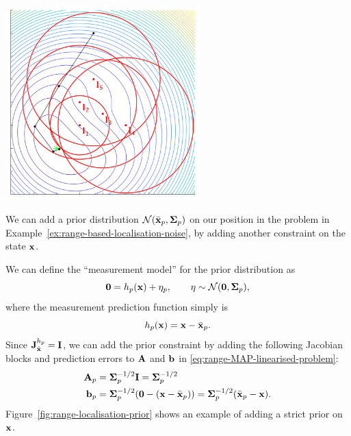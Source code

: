 \begin{example}[frametitle=Range-based localisation with prior]

{
  \centering
  \includegraphics[height=7.5cm]{figures/range-localisation-prior.png}
  \captionsetup{type=figure}
  \label{fig:range-localisation-prior}
  \par
}

We can add a prior distribution $\mathcal{N}(\bar{{\boldsymbol{\mathbf{x}}}}_p, {\boldsymbol{\mathbf{\Sigma}}}_p)$ on our position in the problem in Example~\ref{ex:range-based-localisation-noise}, by adding another constraint on the state ${\boldsymbol{\mathbf{x}}}$.

We can define the ``measurement model'' for the prior distribution as
\begin{equation}
  \boldsymbol{\mathbf{0}} = h_p({\boldsymbol{\mathbf{x}}}) + \eta_p, \qquad \eta \sim \mathcal{N}(\boldsymbol{\mathbf{0}}, {\boldsymbol{\mathbf{\Sigma}}}_p),
\end{equation}
where the measurement prediction function simply is
\begin{equation}
  h_p({\boldsymbol{\mathbf{x}}}) = {\boldsymbol{\mathbf{x}}} - \bar{{\boldsymbol{\mathbf{x}}}}_p.
\end{equation}
Since ${{\boldsymbol{\mathbf{J}}}^{h_p}_{\hat{{\boldsymbol{\mathbf{x}}}}}} = {\boldsymbol{\mathbf{I}}}$, we can add the prior constraint by adding the following Jacobian blocks and prediction errors to ${\boldsymbol{\mathbf{A}}}$ and ${\boldsymbol{\mathbf{b}}}$ in \eqref{eq:range-MAP-linearised-problem}:
\begin{align}
  {\boldsymbol{\mathbf{A}}}_p &= {\boldsymbol{\mathbf{\Sigma}}}_p^{-1/2} {\boldsymbol{\mathbf{I}}} = {\boldsymbol{\mathbf{\Sigma}}}_p^{-1/2}\\
  {\boldsymbol{\mathbf{b}}}_p &= {\boldsymbol{\mathbf{\Sigma}}}_p^{-1/2} (\boldsymbol{\mathbf{0}} - ({\boldsymbol{\mathbf{x}}} - \bar{{\boldsymbol{\mathbf{x}}}}_p)) = {\boldsymbol{\mathbf{\Sigma}}}_p^{-1/2} (\bar{{\boldsymbol{\mathbf{x}}}}_p - {\boldsymbol{\mathbf{x}}}).
\end{align}
Figure~\ref{fig:range-localisation-prior} shows an example of adding a strict prior on ${\boldsymbol{\mathbf{x}}}$. 

\end{example}
